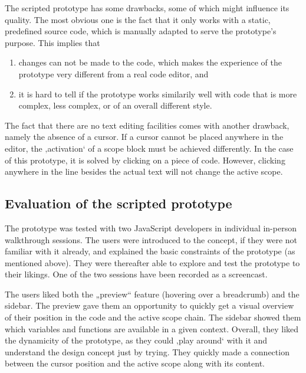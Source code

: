 The scripted prototype has some drawbacks, some of which might influence
its quality. The most obvious one is the fact that it only works with a
static, predefined source code, which is manually adapted to serve the
prototype’s purpose. This implies that

\begin{enumerate}
\def\labelenumi{\arabic{enumi}.}
\itemsep1pt\parskip0pt
\item
  changes can not be made to the code, which makes the experience of the
  prototype very different from a real code editor, and
\item
  it is hard to tell if the prototype works similarily well with code
  that is more complex, less complex, or of an overall different style.
\end{enumerate}

The fact that there are no text editing facilities comes with another
drawback, namely the absence of a cursor. If a cursor cannot be placed
anywhere in the editor, the ‚activation‘ of a scope block must be
achieved differently. In the case of this prototype, it is solved by
clicking on a piece of code. However, clicking anywhere in the line
besides the actual text will not change the active scope.

\subsection{Evaluation of the scripted
prototype}\label{evaluation-of-the-scripted-prototype}

The prototype was tested with two JavaScript developers in individual
in-person walkthrough sessions. The users were introduced to the
concept, if they were not familiar with it already, and explained the
basic constraints of the prototype (as mentioned above). They were
thereafter able to explore and test the prototype to their likings. One
of the two sessions have been recorded as a screencast.

The users liked both the „preview“ feature (hovering over a breadcrumb)
and the sidebar. The preview gave them an opportunity to quickly get a
visual overview of their position in the code and the active scope
chain. The sidebar showed them which variables and functions are
available in a given context. Overall, they liked the dynamicity of the
prototype, as they could ‚play around‘ with it and understand the design
concept just by trying. They quickly made a connection between the
cursor position and the active scope along with its content.

